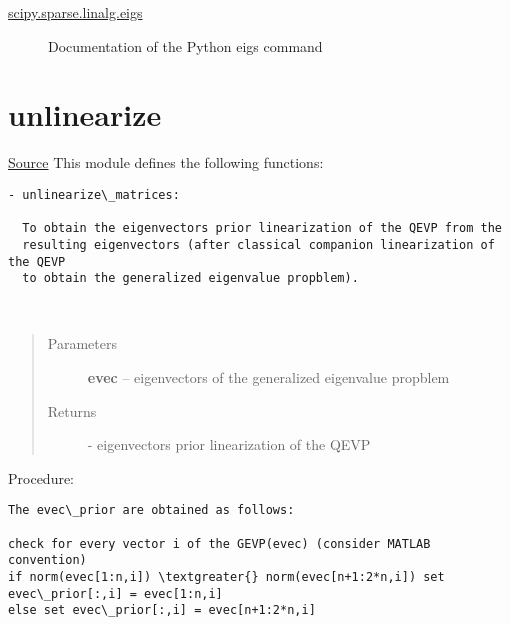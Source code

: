 \documentclass[letterpaper,10pt,english]{sphinxmanual}
\begin{document}

\begin{description}
\item[{\href{http://docs.scipy.org/doc/scipy-0.14.0/reference/generated/scipy.sparse.linalg.eigs.html}{scipy.sparse.linalg.eigs}}] \leavevmode
Documentation of the Python eigs command

\end{description}




\section{unlinearize}
\label{index:unlinearize}
\href{https://bitbucket.org/akadar/brakesqueal0.1/src/10fdbd0824e88ebbee4f44cefa781c01e586db41/brake/initialize/unlinearize.py?at=master}{Source}
\label{index:module-brake.initialize.unlinearize}
This module defines the following functions:

\begin{Verbatim}[commandchars=\\\{\}]
- unlinearize\_matrices:
  
  To obtain the eigenvectors prior linearization of the QEVP from the 
  resulting eigenvectors (after classical companion linearization of the QEVP
  to obtain the generalized eigenvalue propblem).
\end{Verbatim}

\begin{fulllineitems}
\label{index:brake.initialize.unlinearize.unlinearize_matrices}~\begin{quote}\begin{description}
\item[{Parameters}] \leavevmode
\textbf{evec} -- eigenvectors of the generalized eigenvalue propblem

\item[{Returns}] \leavevmode
{} - eigenvectors prior linearization of the QEVP

\end{description}\end{quote}

Procedure:

\begin{Verbatim}[commandchars=\\\{\}]
The evec\_prior are obtained as follows:

check for every vector i of the GEVP(evec) (consider MATLAB convention)
if norm(evec[1:n,i]) \textgreater{} norm(evec[n+1:2*n,i]) set evec\_prior[:,i] = evec[1:n,i]
else set evec\_prior[:,i] = evec[n+1:2*n,i]
\end{Verbatim}

\end{fulllineitems}
\end{document}
